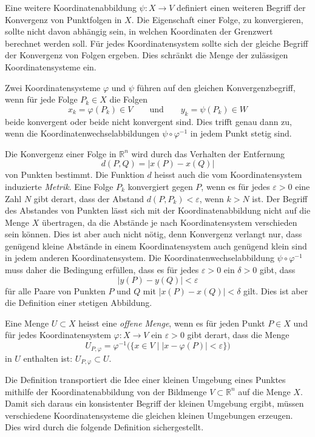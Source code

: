 Eine weitere Koordinatenabbildung $\psi\colon X\to V$ definiert einen
weiteren Begriff der Konvergenz von Punktfolgen in $X$.
Die Eigenschaft einer Folge, zu konvergieren, sollte nicht davon 
abhängig sein, in welchen Koordinaten der Grenzwert berechnet
werden soll.
Für jedes Koordinatensystem sollte sich der gleiche Begriff der
Konvergenz von Folgen ergeben.
Dies schränkt die Menge der zulässigen Koordinatensysteme ein.

Zwei Koordinatensysteme $\varphi$ und $\psi$ führen auf den gleichen
Konvergenzbegriff, wenn für jede Folge $P_k\in X$ die Folgen
\[
x_k=\varphi(P_k)\in V
\qquad\text{und}\qquad
y_k=\psi(P_k)\in W
\]
beide konvergent oder beide nicht konvergent sind.
Dies trifft genau dann zu, wenn die Koordinatenwechselabbildungen
$\psi\circ\varphi^{-1}$ in jedem Punkt stetig sind.

Die Konvergenz einer Folge in $\mathbb{R}^n$ wird durch das Verhalten
der Entfernung
\[
d(P,Q)
=
|x(P)-x(Q)|
\]
von Punkten bestimmt.
Die Funktion $d$ heisst auch die vom Koordinatensystem induzierte 
{\em Metrik}.
%
Eine Folge $P_k$ konvergiert gegen $P$, wenn es für jedes $\varepsilon>0$
eine Zahl $N$ gibt derart, dass der Abstand $d(P,P_k)<\varepsilon$, wenn
$k>N$ ist.
Der Begriff des Abstandes von Punkten lässt sich mit der Koordinatenabbildung
nicht auf die Menge $X$ übertragen, da die Abstände je nach Koordinatensystem
verschieden sein können.
Dies ist aber auch nicht nötig, denn Konvergenz verlangt nur, dass genügend
kleine Abstände in einem Koordinatensystem auch genügend klein sind in jedem
anderen Koordinatensystem.
Die Koordinatenwechselabbildung $\psi\circ\varphi^{-1}$  muss daher die
Bedingung erfüllen, dass es für jedes $\varepsilon>0$ ein $\delta>0$ gibt,
dass 
\[
|y(P)-y(Q)| < \varepsilon
\]
für alle Paare von Punkten $P$ und $Q$ mit $|x(P)-x(Q)| < \delta$
gilt.
Dies ist aber die Definition einer stetigen Abbildung.

\begin{definition}
\label{buch:koordinaten:koordinaten:definition:offenemenge}
Eine Menge $U\subset X$ heisst eine {\em offene Menge}, wenn es für jeden Punkt
%
%
$P\in X$ und für jedes Koordinatensystem $\varphi\colon X\to V$
ein $\varepsilon >0$ gibt derart, dass die Menge
\[
U_{P,\varphi}
=
\varphi^{-1}\bigl(
\{
x\in V
\mid
|x-\varphi(P)|<\varepsilon
\}
\bigr)
\]
in $U$ enthalten ist: $U_{P,\varphi}\subset U$.
\end{definition}

Die Definition transportiert die Idee einer kleinen Umgebung
eines Punktes mithilfe der Koordinatenabbildung von der Bildmenge
$V\subset \mathbb{R}^n$ auf die Menge $X$.
Damit sich daraus ein konsistenter Begriff der kleinen Umgebung 
ergibt, müssen verschiedene Koordinatensysteme die gleichen
kleinen Umgebungen erzeugen.
Dies wird durch die folgende Definition sichergestellt.


